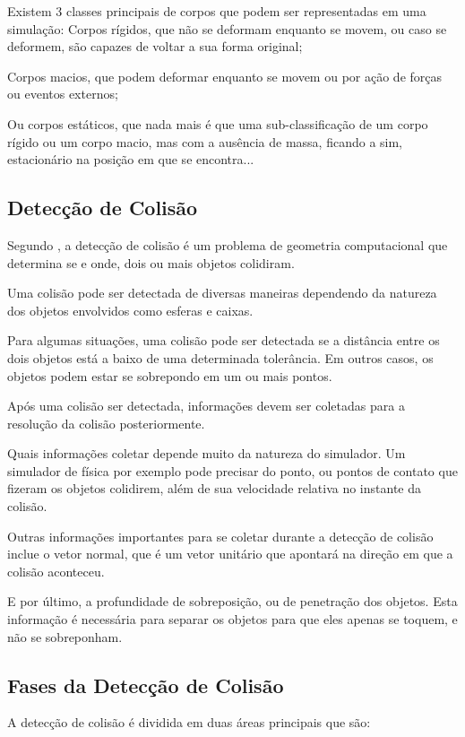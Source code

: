 Existem 3 classes principais de corpos que podem ser representadas em uma simulação:
Corpos rígidos, que não se deformam  enquanto se movem, ou caso se deformem, são capazes de voltar a sua forma original;


Corpos macios, que podem deformar enquanto se movem ou por ação de forças ou eventos externos;

Ou corpos estáticos, que nada mais é que uma sub-classificação de um corpo rígido ou um corpo macio,  mas com a ausência de massa, ficando a sim, estacionário na posição em que se
encontra...


\subsection{Detecção de Colisão}
Segundo , a detecção de colisão é um problema de geometria computacional que
determina se e onde, dois ou mais objetos colidiram.

Uma colisão pode ser detectada de diversas maneiras dependendo da natureza dos
objetos envolvidos como esferas e caixas.

Para algumas situações, uma colisão
pode ser detectada se a distância entre os dois objetos está a baixo de uma
determinada tolerância. Em outros casos, os objetos podem estar se sobrepondo
em um ou mais pontos.

Após uma colisão ser detectada, informações devem ser coletadas para a
resolução da colisão posteriormente.

Quais informações coletar depende muito da natureza do simulador. Um simulador
de física por exemplo pode precisar do ponto, ou pontos de contato que fizeram
os objetos colidirem, além de sua velocidade relativa no instante da colisão.


Outras informações importantes para se coletar durante a detecção de colisão
inclue o vetor normal, que é um vetor unitário que apontará na direção em que a
colisão aconteceu.


E por último, a profundidade de sobreposição, ou de penetração dos objetos.
Esta informação é necessária para separar os objetos para que eles apenas se
toquem, e não se sobreponham.


\subsection{Fases da Detecção de Colisão}

A detecção de colisão é dividida em duas áreas principais que são:

